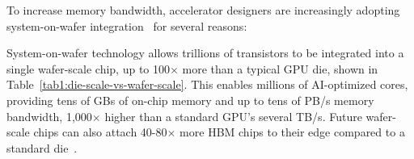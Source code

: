 \begin{table}[t]
    \vspace{-2mm}
\caption{System-on-Die vs. System-on-Wafer}
    \vspace{-3mm}
\label{tab1:die-scale-vs-wafer-scale}
\end{table}


To increase memory bandwidth, accelerator designers are increasingly adopting system-on-wafer integration~\cite{tsmc-advanced-packaging} for several reasons:

 System-on-wafer technology allows trillions of transistors to be integrated into a single wafer-scale chip, up to 100$\times$ more than a typical GPU die, shown in Table~\ref{tab1:die-scale-vs-wafer-scale}. This enables millions of AI-optimized cores, providing tens of GBs of on-chip memory and up to tens of PB/s memory bandwidth, 1,000$\times$ higher than a standard GPU’s several TB/s. Future wafer-scale chips can also attach 40-80$\times$ more HBM chips to their edge compared to a standard die~\cite{tsmc-advanced-packaging}.

